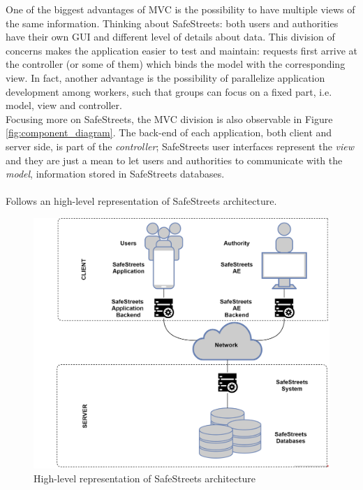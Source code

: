 \documentclass{article}
\begin{document}
				One of the biggest advantages of MVC is the possibility to have multiple views of the same information. Thinking about SafeStreets: both users and authorities have their own GUI and different level of details about data.
				This division of concerns makes the application easier to test and maintain: requests first arrive at the controller (or some of them) which binds the model with the corresponding view. 
				In fact, another advantage is the possibility of parallelize application development among workers, such that groups can focus on a fixed part, i.e. model, view and controller.\\
				
				Focusing more on SafeStreets, the MVC division is also observable in Figure \ref{fig:component_diagram}. The back-end of each application, both client and server side, is part of the \textit{controller}; SafeStreets user interfaces represent the \textit{view} and they are just a mean to let users and authorities to communicate with the \textit{model}, information stored in SafeStreets databases.\\
				\\
				Follows an high-level representation of SafeStreets architecture.
				
				\begin{figure}[H]
					\includegraphics [scale=0.7] {diagrams/tieredArchitecture.png}
					\caption[Architecture]{High-level representation of SafeStreets architecture}
					\label{fig:tieredArchitecture}
				\end{figure}
			
\end{document}
